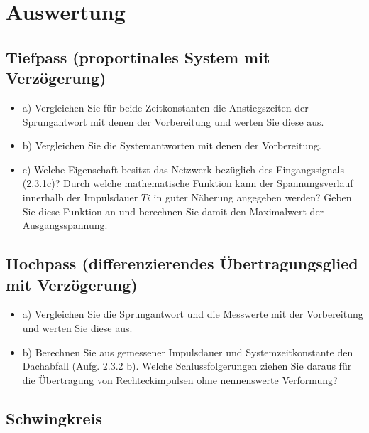 \section{Auswertung}


\subsection{Tiefpass (proportinales System mit Verzögerung)}

\begin{itemize}
\item a) Vergleichen  Sie  für  beide  Zeitkonstanten die  Anstiegszeiten der Sprungantwort mit denen der Vorbereitung und werten Sie diese aus. 
\newline
\item b) Vergleichen Sie die Systemantworten mit denen der Vorbereitung. 
\newline
\item c) Welche Eigenschaft besitzt das Netzwerk bezüglich des Eingangssignals (2.3.1c)? Durch welche mathematische Funktion kann der Spannungsverlauf 
\newline
innerhalb der Impulsdauer $Ti$ in guter Näherung angegeben werden? Geben Sie diese Funktion an und berechnen Sie damit den Maximalwert der Ausgangsspannung. 
\end{itemize}

\subsection{Hochpass (differenzierendes Übertragungsglied mit Verzögerung)}

\begin{itemize}
\item a) Vergleichen Sie die Sprungantwort und die Messwerte mit der Vorbereitung und werten Sie diese aus.
\newline
\item b) Berechnen Sie aus gemessener Impulsdauer und Systemzeitkonstante den Dachabfall (Aufg. 2.3.2 b). Welche Schlussfolgerungen ziehen 
\newline
Sie daraus für die Übertragung von Rechteckimpulsen ohne nennenswerte Verformung?
\end{itemize}

\subsection{Schwingkreis}

